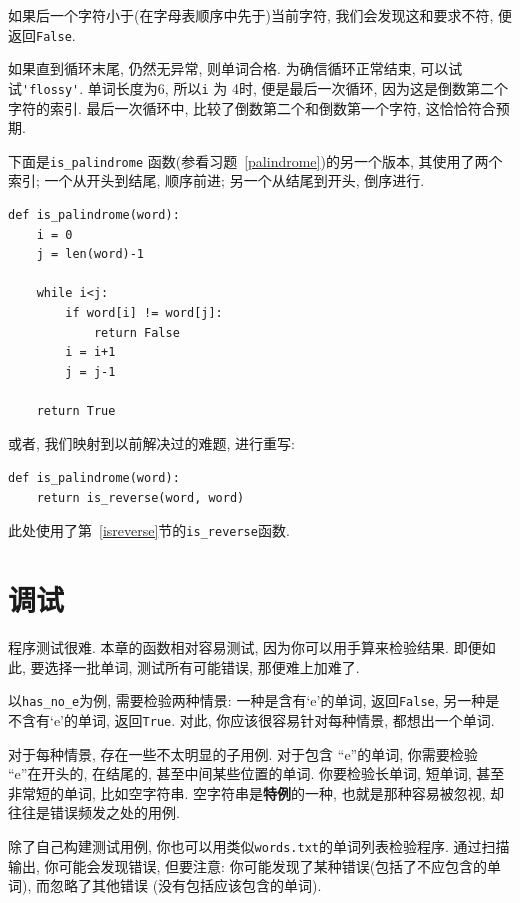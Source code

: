 \documentclass[10pt]{book}
\begin{document}
如果后一个字符小于(在字母表顺序中先于)当前字符, 
我们会发现这和要求不符, 便返回{\tt False}.

如果直到循环末尾, 仍然无异常, 则单词合格. 
为确信循环正常结束, 可以试试\verb"'flossy'". 
单词长度为6, 所以{\tt i} 为 4时, 便是最后一次循环, 
因为这是倒数第二个字符的索引. 最后一次循环中, 
比较了倒数第二个和倒数第一个字符, 这恰恰符合预期. 

下面是\verb"is_palindrome" 函数(参看习题~\ref{palindrome})的另一个版本, 
其使用了两个索引; 一个从开头到结尾, 顺序前进;
另一个从结尾到开头, 倒序进行.

\begin{verbatim}
def is_palindrome(word):
    i = 0
    j = len(word)-1

    while i<j:
        if word[i] != word[j]:
            return False
        i = i+1
        j = j-1

    return True
\end{verbatim}

或者, 我们映射到以前解决过的难题, 进行重写:

\begin{verbatim}
def is_palindrome(word):
    return is_reverse(word, word)
\end{verbatim}
%
此处使用了第~\ref{isreverse}节的\verb"is_reverse"函数.


\section{调试}

程序测试很难. 本章的函数相对容易测试, 因为你可以用手算来检验结果. 
即便如此, 要选择一批单词, 测试所有可能错误, 那便难上加难了. 

以\verb"has_no_e"为例, 需要检验两种情景: 一种是含有`e'的单词, 返回{\tt False}, 
另一种是不含有`e'的单词, 返回{\tt True}. 
对此, 你应该很容易针对每种情景, 都想出一个单词. 

对于每种情景, 存在一些不太明显的子用例. 
对于包含 ``e''的单词, 你需要检验 ``e''在开头的, 在结尾的, 甚至中间某些位置的单词. 
你要检验长单词, 短单词, 甚至非常短的单词, 比如空字符串. 
空字符串是{\bf 特例}的一种, 也就是那种容易被忽视, 却往往是错误频发之处的用例. 

除了自己构建测试用例, 你也可以用类似{\tt words.txt}的单词列表检验程序. 
通过扫描输出, 你可能会发现错误, 但要注意: 
你可能发现了某种错误(包括了不应包含的单词), 而忽略了其他错误
(没有包括应该包含的单词). 
\end{document}
